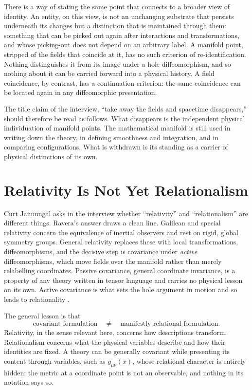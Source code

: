\documentclass[11pt]{article}
\theoremstyle{plain}
\theoremstyle{definition}
\theoremstyle{remark}
\begin{document}
There is a way of stating the same point that connects to a broader view of identity. An entity, on this view, is not an unchanging substrate that persists underneath its changes but a distinction that is maintained through them: something that can be picked out again after interactions and transformations, and whose picking-out does not depend on an arbitrary label. A manifold point, stripped of the fields that coincide at it, has no such criterion of re-identification. Nothing distinguishes it from its image under a hole diffeomorphism, and so nothing about it can be carried forward into a physical history. A field coincidence, by contrast, has a continuation criterion: the same coincidence can be located again in any diffeomorphic presentation.

The title claim of the interview, ``take away the fields and spacetime disappears,'' should therefore be read as follows. What disappears is the independent physical individuation of manifold points. The mathematical manifold is still used in writing down the theory, in defining smoothness and integration, and in comparing configurations. What is withdrawn is its standing as a carrier of physical distinctions of its own.

\section{Relativity Is Not Yet Relationalism}\label{sec:relativity}

Curt Jaimungal asks in the interview whether ``relativity'' and ``relationalism'' are different things. Ravera's answer draws a clean line. Galilean and special relativity concern the equivalence of inertial observers and rest on rigid, global symmetry groups. General relativity replaces these with local transformations, diffeomorphisms, and the decisive step is covariance under \emph{active} diffeomorphisms, which move fields over the manifold rather than merely relabelling coordinates. Passive covariance, general coordinate invariance, is a property of any theory written in tensor language and carries no physical lesson on its own. Active covariance is what sets the hole argument in motion and so leads to relationality \cite{toe,fr-meaning}.

The general lesson is that
\begin{equation}
\text{covariant formulation}\quad\neq\quad\text{manifestly relational formulation}.
\end{equation}
Relativity, in the sense relevant here, concerns how descriptions transform. Relationalism concerns what the physical variables describe and how their identities are fixed. A theory can be generally covariant while presenting its content through variables, such as $g_{\mu\nu}(x)$, whose relational character is entirely hidden: the metric at a coordinate point is not an observable, and nothing in its notation says so.
\end{document}
